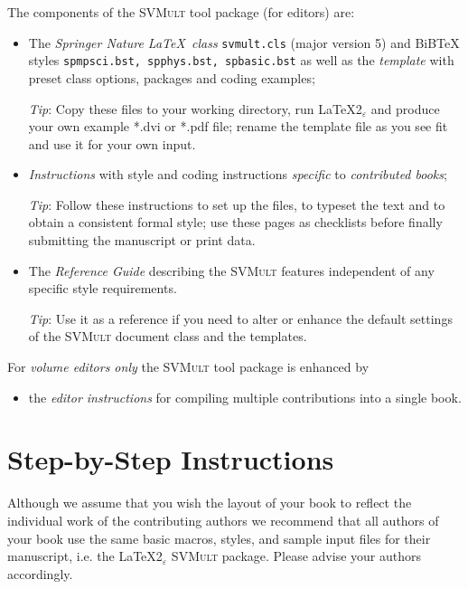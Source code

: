 \documentclass[graybox]{svmult}
\begin{document}
\begin{refguide}
The components of the \textsc{SVMult} tool package (for editors) are:

\begin{itemize}
\item The \emph{Springer Nature \LaTeX~class} \texttt{svmult.cls} (major version 5) and BiBTeX styles \texttt{spmpsci.bst, spphys.bst, spbasic.bst} as well as the \emph{template} with preset class options, packages and coding examples;

\emph{Tip}: Copy these files to your working directory, run \LaTeX2$_\varepsilon$ and produce your own example *.dvi or *.pdf file; rename the template file as you see fit and use it for your own input.

\item \emph{Instructions} with style and coding instructions \emph{specific} to \emph{contributed books};

\emph{Tip}: Follow these instructions to set up the files, to typeset the text and to obtain a consistent formal style; use these pages as checklists before finally submitting the manuscript or print data.

\item The \emph{Reference Guide} describing the \textsc{SVMult} features independent of any specific style requirements.

\emph{Tip}: Use it as a reference if you need to alter or enhance the default
settings of the \textsc{SVMult} document class and the templates.
\end{itemize}
For \emph{volume editors only} the \textsc{SVMult} tool package is enhanced by

\begin{itemize}
\item the \emph{editor instructions} for compiling multiple contributions into a single book.
\end{itemize}

\section{ Step-by-Step Instructions}

Although we assume that you wish the layout of your book to reflect the individual work of the contributing authors we recommend that all authors of your book use the same basic macros, styles, and sample input files for their manuscript, i.e. the \LaTeX2$_\varepsilon$ \textsc{SVMult} package. Please advise your authors accordingly.


\end{refguide}
\end{document}
